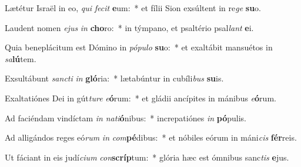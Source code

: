 \item Lætétur Israël in eo, \textit{qui} \textit{fe}\textit{cit} \textbf{e}um:~* et fílii Sion exsúltent in re\textit{ge} \textbf{su}o.
\item Laudent nomen \textit{e}\textit{jus} \textit{in} \textbf{cho}ro:~* in týmpano, et psaltério psal\textit{lant} \textbf{e}i.
\item Quia beneplácitum est Dómino in \textit{pó}\textit{pu}\textit{lo} \textbf{su}o:~* et exaltábit mansuétos in \textit{sa}\textbf{lú}tem.
\item Exsultábunt \textit{sanc}\textit{ti} \textit{in} \textbf{gló}ria:~* lætabúntur in cubíli\textit{bus} \textbf{su}is.
\item Exaltatiónes Dei in gút\textit{tu}\textit{re} \textit{e}\textbf{ó}rum:~* et gládii ancípites in mánibus \textit{e}\textbf{ó}rum.
\item Ad faciéndam vindíctam \textit{in} \textit{na}\textit{ti}\textbf{ó}nibus:~* increpatiónes \textit{in} \textbf{pó}pulis.
\item Ad alligándos reges eó\textit{rum} \textit{in} \textit{com}\textbf{pé}dibus:~* et nóbiles eórum in máni\textit{cis} \textbf{fér}reis.
\item Ut fáciant in eis judí\textit{ci}\textit{um} \textit{con}\textbf{scríp}tum:~* glória hæc est ómnibus sanc\textit{tis} \textbf{e}jus.
